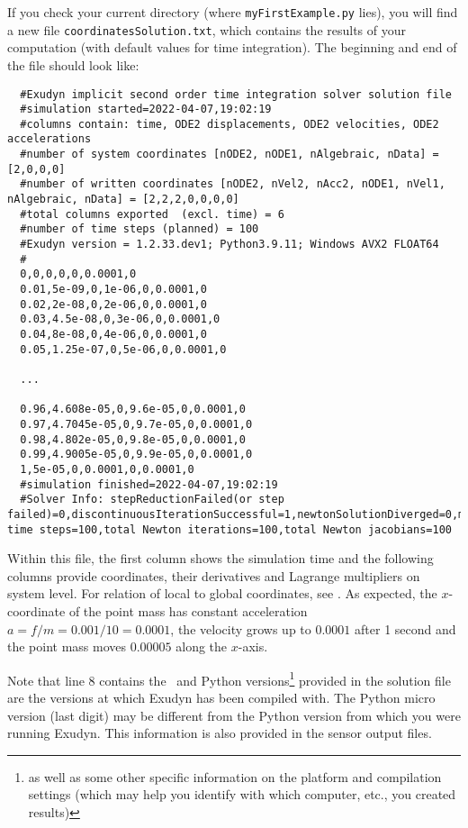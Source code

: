 If you check your current directory (where \texttt{myFirstExample.py} lies), you will find a new file \texttt{coordinatesSolution.txt}, which contains the results of your computation (with default values for time integration).
The beginning and end of the file should look like: \vspace{6pt}\\
\begin{lstlisting}
  #Exudyn implicit second order time integration solver solution file
  #simulation started=2022-04-07,19:02:19
  #columns contain: time, ODE2 displacements, ODE2 velocities, ODE2 accelerations
  #number of system coordinates [nODE2, nODE1, nAlgebraic, nData] = [2,0,0,0]
  #number of written coordinates [nODE2, nVel2, nAcc2, nODE1, nVel1, nAlgebraic, nData] = [2,2,2,0,0,0,0]
  #total columns exported  (excl. time) = 6
  #number of time steps (planned) = 100
  #Exudyn version = 1.2.33.dev1; Python3.9.11; Windows AVX2 FLOAT64
  #
  0,0,0,0,0,0.0001,0
  0.01,5e-09,0,1e-06,0,0.0001,0
  0.02,2e-08,0,2e-06,0,0.0001,0
  0.03,4.5e-08,0,3e-06,0,0.0001,0
  0.04,8e-08,0,4e-06,0,0.0001,0
  0.05,1.25e-07,0,5e-06,0,0.0001,0

  ...

  0.96,4.608e-05,0,9.6e-05,0,0.0001,0
  0.97,4.7045e-05,0,9.7e-05,0,0.0001,0
  0.98,4.802e-05,0,9.8e-05,0,0.0001,0
  0.99,4.9005e-05,0,9.9e-05,0,0.0001,0
  1,5e-05,0,0.0001,0,0.0001,0
  #simulation finished=2022-04-07,19:02:19
  #Solver Info: stepReductionFailed(or step failed)=0,discontinuousIterationSuccessful=1,newtonSolutionDiverged=0,massMatrixNotInvertible=1,total time steps=100,total Newton iterations=100,total Newton jacobians=100
\end{lstlisting}
%
Within this file, the first column shows the simulation time and the following columns provide coordinates, their derivatives and Lagrange multipliers on system level. For relation of local to global coordinates, see . As expected, the $x$-coordinate of the point mass has constant acceleration $a=f/m=0.001/10=0.0001$, the velocity grows up to $0.0001$ after 1 second and the point mass moves $0.00005$ along the $x$-axis.

Note that line 8 contains the \codeName\ and Python versions\footnote{as well as some other specific information on the platform and compilation settings (which may help you identify with which computer, etc., you created results)} provided in the solution file are the versions at which Exudyn has been compiled with.
The Python micro version (last digit) may be different from the Python version from which you were running Exudyn.
This information is also provided in the sensor output files.
%
\newpage
{}


